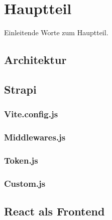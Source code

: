 \newpage

\section{Hauptteil} \label{hauptteil}
Einleitende Worte zum Hauptteil.
\subsection{Architektur} \label{architektur}


\subsection{Strapi} \label{strapiMain}

\subsubsection{Vite.config.js} \label{viteconfigjs}

\subsubsection{Middlewares.js} \label{middlewares}

\subsubsection{Token.js} \label{token}

\subsubsection{Custom.js} \label{custom}


\subsection{React als Frontend} \label{reactFrontend}

